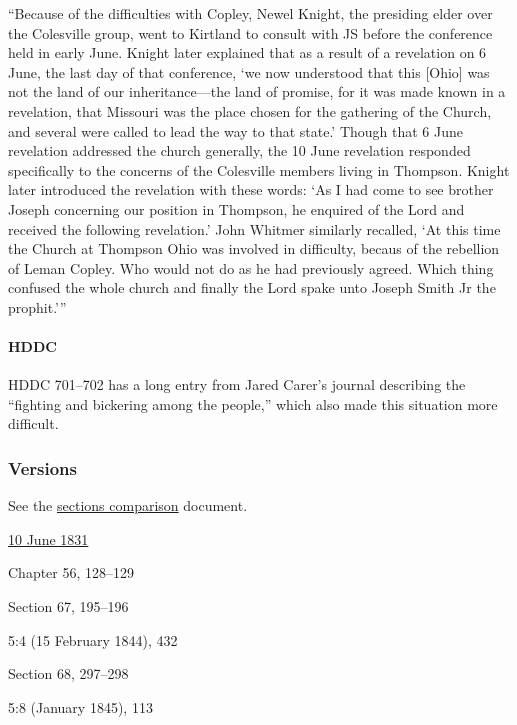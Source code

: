 			``Because of the difficulties with Copley, Newel Knight, the presiding elder over the Colesville group, went to Kirtland to consult with JS before the conference held in early June. Knight later explained that as a result of a revelation on 6 June, the last day of that conference, `we now understood that this [Ohio] was not the land of our inheritance---the land of promise, for it was made known in a revelation, that Missouri was the place chosen for the gathering of the Church, and several were called to lead the way to that state.' Though that 6 June revelation addressed the church generally, the 10 June revelation responded specifically to the concerns of the Colesville members living in Thompson. Knight later introduced the revelation with these words: `As I had come to see brother Joseph concerning our position in Thompson, he enquired of the Lord and received the following revelation.' John Whitmer similarly recalled, `At this time the Church at Thompson Ohio was involved in difficulty, becaus of the rebellion of Leman Copley. Who would not do as he had previously agreed. Which thing confused the whole church and finally the Lord spake unto Joseph Smith Jr the prophit.'''
			
		\paragraph{HDDC}
		
			HDDC 701--702 has a long entry from Jared Carer's journal describing the ``fighting and bickering among the people,'' which also made this situation more difficult.
		
	\subsubsection{Versions}
		\label{DC54-V}
		
		See the \href{https://drive.google.com/file/d/1goAvNz8jS4R8slYfMG_db55Ty2z_vmgK/view?usp=sharing}{sections comparison} document.
	
		\begin{compactdesc}
			\item[JSP] \hyperref[EMS-1831-JS-10-JUN-1831]{10 June 1831}
			\item[BC] Chapter 56, 128--129
			\item[DC 1835] Section 67, 195--196
			\item[TS] 5:4 (15 February 1844), 432
			\item[DC 1844] Section 68, 297--298
			\item[MS] 5:8 (January 1845), 113
		\end{compactdesc}


